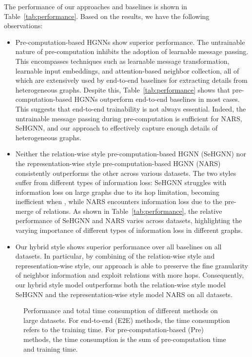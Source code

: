\documentclass[lettersize,journal]{IEEEtran}
\begin{document}
The performance of our approaches and baselines is shown in Table~\ref{tab:performance}.
Based on the results, we have the following observations:
\begin{itemize}
\item Pre-computation-based HGNNs show superior performance. 
The untrainable nature of pre-computation inhibits the adoption of learnable message passing. 
This encompasses techniques such as learnable message transformation, learnable input embeddings, and attention-based neighbor collection, all of which are extensively used by end-to-end baselines for extracting details from heterogeneous graphs.
Despite this, Table~\ref{tab:performance} shows that pre-computation-based HGNNs outperform end-to-end baselines in most cases.
This suggests that end-to-end trainability is not always essential.
Indeed, the untrainable message passing during pre-computation is sufficient for NARS, SeHGNN, and our approach to effectively capture enough details of heterogeneous graphs.
\item Neither the relation-wise style pre-computation-based HGNN (SeHGNN) nor the representation-wise style pre-computation-based HGNN (NARS) consistently outperforms the other across various datasets.
The two styles suffer from different types of information loss: SeHGNN struggles with information loss on large graphs due to its hop limitation, becoming inefficient when , while NARS encounters information loss due to the pre-merge of relations.
As shown in Table~\ref{tab:performance}, the relative performance of SeHGNN and NARS varies across datasets, highlighting the varying importance of different types of information loss in different graphs.
\item Our hybrid style shows superior performance over all baselines on all datasets.
In particular, by combining of the relation-wise style and representation-wise style, our approach is able to preserve the fine granularity of neighbor information and exploit relations with more hops.
Consequently, our hybrid style model outperforms both the relation-wise style model SeHGNN and the representation-wise style model NARS on all datasets.
\end{itemize}





\begin{figure}[!t]
\vspace{-5mm}
\centering
{}
\caption{
Performance and total time consumption of different methods on large datasets.
For end-to-end (E2E) methods, the time consumption refers to the training time.
For pre-computation-based (Pre) methods, the time consumption is the sum of pre-computation time and training time.
}
\label{fig:visualize_time_score} \end{figure}
\end{document}
